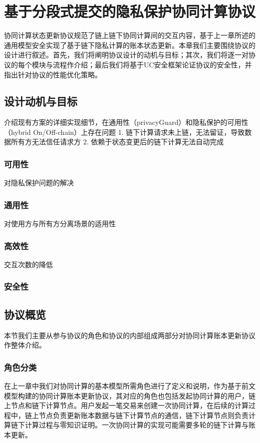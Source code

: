\chapter{基于分段式提交的隐私保护协同计算协议}
协同计算状态更新协议规范了链上链下协同计算间的交互内容，基于上一章所述的通用模型安全实现了基于链下隐私计算的账本状态更新。本章我们主要围绕协议的设计进行叙述。首先，我们将阐明协议设计的动机与目标；其次，我们将逐一对协议的每个模块与流程作介绍；最后我们将基于UC安全框架论证协议的安全性，并指出针对协议的性能优化策略。
\section{设计动机与目标}
介绍现有方案的详细实现细节，在通用性（privacyGuard）和隐私保护的可用性（hybrid On/Off-chain）上存在问题
1. 链下计算请求未上链，无法留证，导致数据所有方无法信任请求方
2. 依赖于状态变更后的链下计算无法自动完成
\subsection{可用性}
对隐私保护问题的解决

\subsection{通用性}
对使用方与所有方分离场景的适用性

\subsection{高效性}
交互次数的降低

\subsection{安全性}

\section{协议概览}
本节我们主要从参与协议的角色和协议的内部组成两部分对协同计算账本更新协议作整体介绍。
\subsection{角色分类}
在上一章中我们对协同计算的基本模型所需角色进行了定义和说明，作为基于前文模型构建的协同计算账本更新协议，其对应的角色也包括发起协同计算的用户，链上节点和链下计算节点。用户发起一笔交易来创建一次协同计算，在后续的计算过程中，链上节点负责更新账本数据与链下计算节点的通信，链下计算节点则负责计算链下计算过程与零知识证明。一次协同计算的实现可能需要多轮的链下计算与账本更新。

